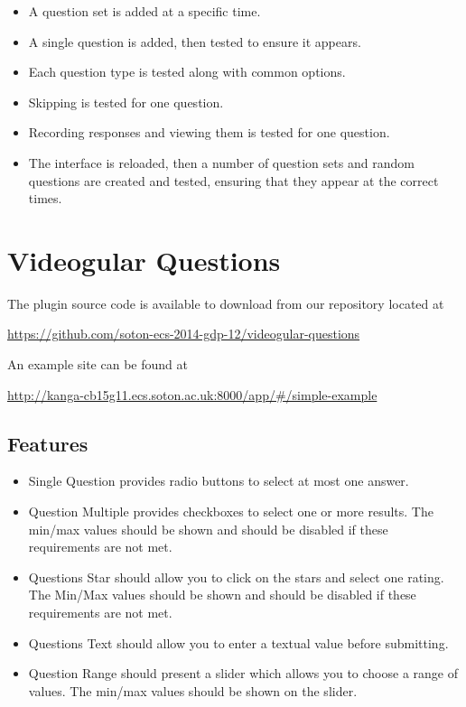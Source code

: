 \documentclass[12pt,a4paper]{article}
\begin{document}
\begin{itemize}
\item A question set is added at a specific time.
\item A single question is added, then tested to ensure it appears.
\item Each question type is tested along with common options.
\item Skipping is tested for one question.
\item Recording responses and viewing them is tested for one question.
\item The interface is reloaded, then a number of question sets and random questions are created and tested, ensuring that they appear at the correct times.
\end{itemize}

\section{Videogular Questions}

The plugin source code is available to download from our repository located at

\url{https://github.com/soton-ecs-2014-gdp-12/videogular-questions}

An example site can be found at

\url{http://kanga-cb15g11.ecs.soton.ac.uk:8000/app/#/simple-example}

\subsection{Features}

\begin{itemize}
\item Single Question provides radio buttons to select at most one answer.
\item Question Multiple provides checkboxes to select one or more results. The min/max values should be shown and  should be disabled if these requirements are not met.
\item Questions Star should allow you to click on the stars and select one rating. The Min/Max values should be shown and  should be disabled if these requirements are not met.
\item Questions Text should allow you to enter a textual value before submitting.
\item Question Range should present a slider which allows you to choose a range of values. The min/max values should be shown on the slider.
\end{itemize}
\end{document}
